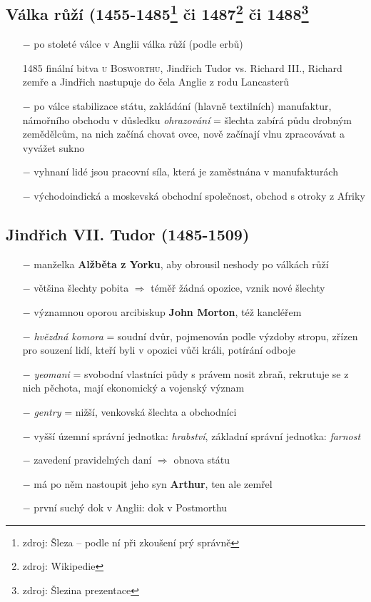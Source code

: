 \documentclass{article}
\begin{document}
\subsection*{Válka růží (1455-1485\footnote{zdroj: Šleza -- podle ní při zkoušení prý správně} či 1487\footnote{zdroj: Wikipedie} či 1488\footnote{zdroj: Šlezina prezentace}}
\begin{itemize}
    \vspace{-0.5em}
    \setlength\itemsep{0.15em}
    \item[$-$] po stoleté válce v Anglii válka růží (podle erbů)
    \item[1485] finální bitva \textsc{u Bosworthu}, Jindřich Tudor vs. Richard III., Richard zemře a Jindřich nastupuje do čela Anglie z rodu Lancasterů
    \item[$-$] po válce stabilizace státu, zakládání (hlavně textilních) manufaktur, námořního obchodu v důsledku \textit{ohrazování} = šlechta zabírá půdu drobným zemědělcům, na nich začíná chovat ovce, nově začínají vlnu zpracovávat a vyvážet sukno
    \item[$-$] vyhnaní lidé jsou pracovní síla, která je zaměstnána v manufakturách
    \item[$-$] východoindická a moskevská obchodní společnost, obchod s otroky z Afriky
\end{itemize}

\subsection*{Jindřich VII. Tudor (1485-1509)}
\begin{itemize}
    \vspace{-0.5em}
    \setlength\itemsep{0.15em}
    \item[$-$] manželka \textbf{Alžběta z Yorku}, aby obrousil neshody po válkách růží
    \item[$-$] většina šlechty pobita $\Rightarrow$ téměř žádná opozice, vznik nové šlechty
    \item[$-$] významnou oporou arcibiskup \textbf{John Morton}, též kancléřem
    \item[$-$] \textit{hvězdná komora} = soudní dvůr, pojmenován podle výzdoby stropu, zřízen pro souzení lidí, kteří byli v opozici vůči králi, potírání odboje
    \item[$-$]  \textit{yeomani} = svobodní vlastníci půdy s právem nosit zbraň, rekrutuje se z nich pěchota, mají ekonomický a vojenský význam
    \item[$-$] \textit{gentry} = nižší, venkovská šlechta a obchodníci
    \item[$-$] vyšší územní správní jednotka: \textit{hrabství}, základní správní jednotka: \textit{farnost}
    \item[$-$] zavedení pravidelných daní $\Rightarrow$ obnova státu
    \item[$-$] má po něm nastoupit jeho syn \textbf{Arthur}, ten ale zemřel
    \item[$-$] první suchý dok v Anglii: dok v Postmorthu
\end{itemize}
\end{document}
